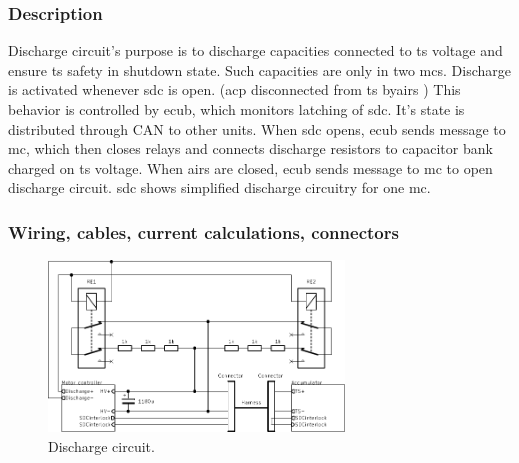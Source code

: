 \subsubsection{Description}

Discharge circuit's purpose is to discharge capacities connected to \gls{ts} voltage and ensure \gls{ts} safety in shutdown state. Such capacities are only in two \glspl{mc}.
Discharge is activated whenever \gls{sdc} is open. (\gls{acp} disconnected from \gls{ts} by\glspl{air} ) This behavior is controlled by \gls{ecub}, which monitors latching of \gls{sdc}. It's state is distributed through CAN to other units.
When \gls{sdc} opens, \gls{ecub} sends message to \gls{mc}, which then closes relays and connects discharge resistors to capacitor bank charged on \gls{ts} voltage.
When \glspl{air} are closed, \gls{ecub} sends message to \gls{mc} to open discharge circuit.
\gls{sdc} shows simplified discharge circuitry for one \gls{mc}.

\subsubsection{Wiring, cables, current calculations, connectors}

\begin{figure}[H]
	\centering
	\includegraphics[width=0.7\textwidth]{./img/MC_discharge.pdf}
	\caption{Discharge circuit.}
	\label{fig:discharge-circuit}
\end{figure}

